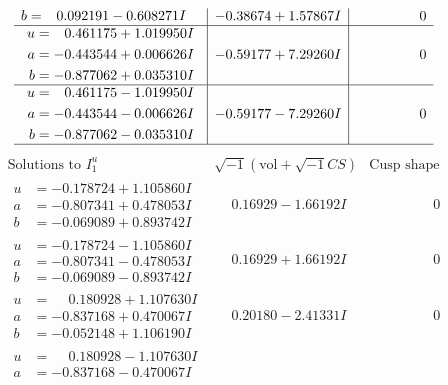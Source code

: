 \documentclass[1p]{elsarticle_modified}
\theoremstyle{definition}
\newcommand{\I}{\sqrt{-1}}
\begin{document}
$$\begin{array}{c|c|c}
\begin{aligned}
b &= \phantom{-}0.092191 - 0.608271 I\end{aligned}
 & -0.38674 + 1.57867 I & \phantom{-0.000000 } 0 \\ \hline\begin{aligned}
u &= \phantom{-}0.461175 + 1.019950 I \\
a &= -0.443544 + 0.006626 I \\
b &= -0.877062 + 0.035310 I\end{aligned}
 & -0.59177 + 7.29260 I & \phantom{-0.000000 } 0 \\ \hline\begin{aligned}
u &= \phantom{-}0.461175 - 1.019950 I \\
a &= -0.443544 - 0.006626 I \\
b &= -0.877062 - 0.035310 I\end{aligned}
 & -0.59177 - 7.29260 I & \phantom{-0.000000 } 0\\
 \hline 
 \end{array}$$\newpage$$\begin{array}{c|c|c}  
\text{Solutions to }I^u_{1}& \I (\text{vol} + \sqrt{-1}CS) & \text{Cusp shape}\\
 \hline 
\begin{aligned}
u &= -0.178724 + 1.105860 I \\
a &= -0.807341 + 0.478053 I \\
b &= -0.069089 + 0.893742 I\end{aligned}
 & \phantom{-}0.16929 - 1.66192 I & \phantom{-0.000000 } 0 \\ \hline\begin{aligned}
u &= -0.178724 - 1.105860 I \\
a &= -0.807341 - 0.478053 I \\
b &= -0.069089 - 0.893742 I\end{aligned}
 & \phantom{-}0.16929 + 1.66192 I & \phantom{-0.000000 } 0 \\ \hline\begin{aligned}
u &= \phantom{-}0.180928 + 1.107630 I \\
a &= -0.837168 + 0.470067 I \\
b &= -0.052148 + 1.106190 I\end{aligned}
 & \phantom{-}0.20180 - 2.41331 I & \phantom{-0.000000 } 0 \\ \hline\begin{aligned}
u &= \phantom{-}0.180928 - 1.107630 I \\
a &= -0.837168 - 0.470067 I \\

\end{aligned}
\end{array}$$
\end{document}
